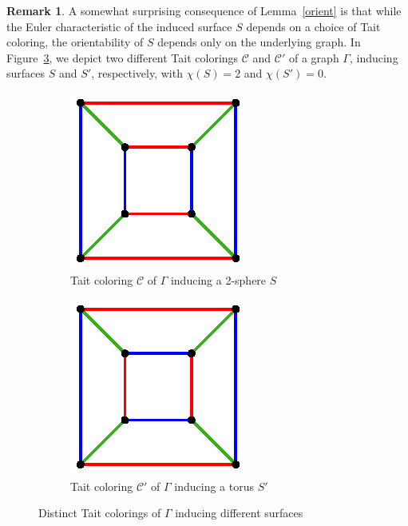 \documentclass[11pt, oneside]{amsart}
\theoremstyle{theorem}
\theoremstyle{definition}
\newtheorem{remark}[theorem]{Remark}
\theoremstyle{theorem}
\begin{document}
\begin{remark}
 A somewhat surprising consequence of Lemma~\ref{orient} is that while the Euler characteristic of the induced surface $S$ depends on a choice of Tait coloring, the orientability of $S$ depends only on the underlying graph.  In Figure~\ref{color}, we depict two different Tait colorings $\mathcal C$ and $\mathcal C'$ of a graph $\Gamma$, inducing surfaces $S$ and $S'$, respectively, with $\chi(S) = 2$ and $\chi(S') = 0$.  
\end{remark}

\begin{figure}[h!]
\begin{subfigure}{.5\textwidth}
  \centering
  \includegraphics[width=.5\linewidth]{coloring1.eps}
  \caption{Tait coloring $\mathcal{C}$ of $\Gamma$ inducing a 2-sphere $S$}
  \label{color1}
\end{subfigure}%
\begin{subfigure}{.5\textwidth}
  \centering
  \includegraphics[width=.5\linewidth]{coloring2.eps}
  \caption{Tait coloring $\mathcal{C}'$ of $\Gamma$ inducing a torus $S'$}
  \label{color2}
\end{subfigure}
\caption{Distinct Tait colorings of $\Gamma$ inducing different surfaces}
\label{color}
\end{figure}
\end{document}
